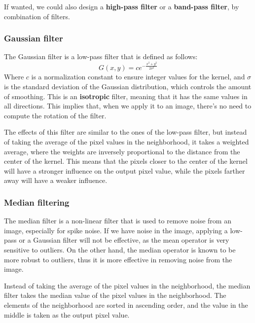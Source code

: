 If wanted, we could also design a \textbf{high-pass filter} or a \textbf{band-pass filter}, by combination of filters.

\subsubsection{Gaussian filter}
The Gaussian filter is a low-pass filter that is defined as follows:
\begin{equation}
    G(x,y) = c e^{-\frac{x^2 + y^2}{2\sigma^2}}
\end{equation}
Where $c$ is a normalization constant to ensure integer values for the kernel, and $\sigma$ is the standard deviation of the Gaussian distribution, which controls the amount of smoothing.
This is an \textbf{isotropic} filter, meaning that it has the same values in all directions. This implies that,
when we apply it to an image, there's no need to compute the rotation of the filter.

The effects of this filter are similar to the ones of the low-pass filter, but instead of taking the average of the pixel values
in the neighborhood, it takes a weighted average, where the weights are inversely proportional to the distance from the center of the kernel. 
This means that the pixels closer to the center of the kernel will have a stronger influence on the output pixel value, while the pixels farther away will have a weaker influence.

\subsubsection{Median filtering}
The median filter is a non-linear filter that is used to remove noise from an image, especially for spike noise.
If we have noise in the image, applying a low-pass or a Gaussian filter will not be effective, as the mean operator is very sensitive to outliers.
On the other hand, the median operator is known to be more robust to outliers, thus it is more effective in removing noise from the image.

Instead of taking the average of the pixel values in the neighborhood, the median filter takes the median value of the pixel values in the neighborhood.
The elements of the neighborhood are sorted in ascending order, and the value in the middle is taken as the output pixel value.

